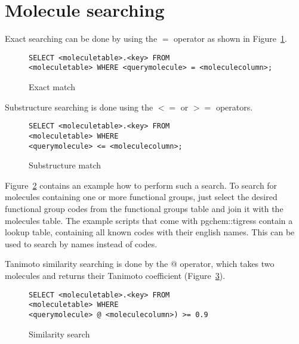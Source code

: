 \documentclass[a4paper]{article}
\begin{document}
\section{Molecule searching}
Exact searching can be done by using the $=$ operator as shown in Figure~\ref{fig:exactmatch}.
\begin{figure}[tb]
\begin{verbatim}
SELECT <moleculetable>.<key> FROM
<moleculetable> WHERE <querymolecule> = <moleculecolumn>;
\end{verbatim}
\caption{Exact match}
	\label{fig:exactmatch}
\end{figure}
Substructure searching is done using the $<=$ or $>=$ operators.
\begin{figure}[tb]
\begin{verbatim}
SELECT <moleculetable>.<key> FROM
<moleculetable> WHERE
<querymolecule> <= <moleculecolumn>;
\end{verbatim}
\caption{Substructure match}
	\label{fig:substruct}
\end{figure}
Figure~\ref{fig:substruct} contains an example how to perform such a search.
To search for molecules containing one or more functional groups, just select the desired functional group codes from the functional groups table and join it with the molecules table. The example scripts that come with pgchem::tigress contain a lookup table, containing all known codes with their english names. This can be used to search by names instead of codes.
\par
Tanimoto similarity searching is done by the @ operator, which takes two molecules and returns their Tanimoto coefficient (Figure~\ref{fig:tsim}). 
\begin{figure}[tb]
\begin{verbatim}
SELECT <moleculetable>.<key> FROM
<moleculetable> WHERE
<querymolecule> @ <moleculecolumn>) >= 0.9\end{verbatim}
\caption{Similarity search}
	\label{fig:tsim}
\end{figure}
\end{document}
